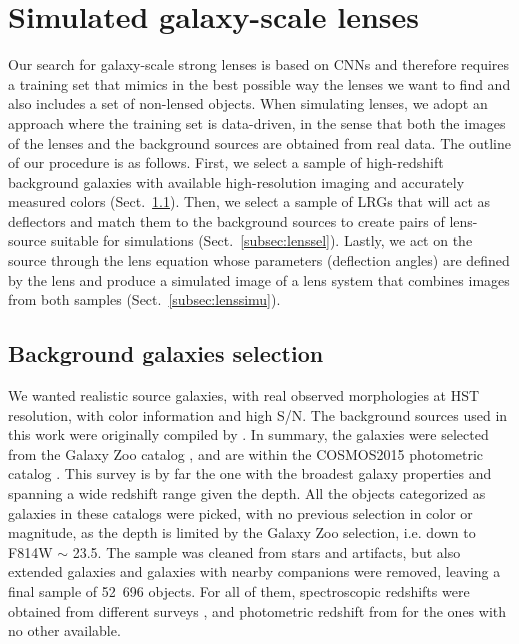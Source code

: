 \documentclass[tradiabstract,twocolumn]{aa}
\begin{document}
\section{Simulated galaxy-scale lenses}\label{sec:simulations}

Our search for galaxy-scale strong lenses is based on CNNs and therefore requires a training set that mimics in the best possible way the lenses we want to find and also includes a set of non-lensed objects. When simulating lenses, we adopt an approach where the training set is data-driven, in the sense that both the images of the lenses and the background sources are obtained from real data. The outline of our procedure is as follows. First, we select a sample of high-redshift background galaxies with available high-resolution imaging and accurately measured colors (Sect.~\ref{subsec:sourcesel}). Then, we select a sample of LRGs that will act as deflectors and match them to the background sources to create pairs of lens-source suitable for simulations (Sect.~\ref{subsec:lenssel}). Lastly, we act on the source through the lens equation whose parameters (deflection angles) are defined by the lens and produce a simulated image of a lens system that combines images from both samples (Sect.~\ref{subsec:lenssimu}).

\subsection{Background galaxies selection}\label{subsec:sourcesel}

We wanted realistic source galaxies, with real observed morphologies at HST resolution, with color information and high S/N. The background sources used in this work were originally compiled by \cite{Canameras2020}. %
In summary, the galaxies were selected from the Galaxy Zoo catalog \citep{Willett2017}, and are within the COSMOS2015 photometric catalog \citep{Laigle2016}. This survey is by far the one with the broadest galaxy properties and spanning a wide redshift range given the depth. All the objects categorized as galaxies in these catalogs were picked, with no previous selection in color or magnitude, as the depth is limited by the Galaxy Zoo selection, i.e. down to F814W $\sim$ 23.5. The sample was cleaned from stars and artifacts, but also extended galaxies and galaxies with nearby companions were removed, leaving a final sample of 52~696 objects. For all of them, spectroscopic redshifts were obtained from different surveys \citep{Lilly2007,Comparat2015,Silverman2015,LeFevre2015,Tasca2017,Hasinger2018}, and photometric redshift from \cite{Laigle2016} for the ones with no other available. 
\end{document}
